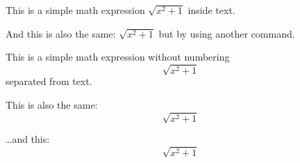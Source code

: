 \documentclass{article} %
\begin{document}

This is a simple math expression \(\sqrt{x^2+1}\) inside text. 

And this is also the same: 
\begin{math}
\sqrt{x^2+1}
\end{math}
but by using another command.

This is a simple math expression without numbering
\[\sqrt{x^2+1}\] 
separated from text.

This is also the same:
\begin{displaymath}
\sqrt{x^2+1}
\end{displaymath}

\ldots and this:
\begin{equation*}
\sqrt{x^2+1}
\end{equation*}
\end{document}
